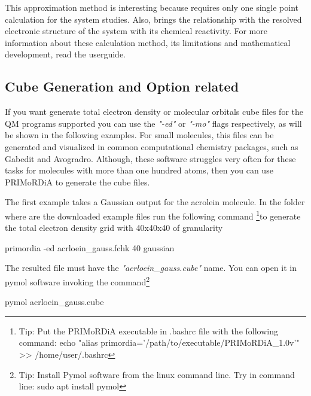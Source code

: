 \documentclass[a4paper,11pt]{refart}
\begin{document}
This approximation method is interesting because requires only one single point calculation for the system studies. Also, brings the relationship with the resolved electronic structure of the system with its chemical reactivity. For more information about these calculation method, its limitations and mathematical development, read the userguide.

\subsection{Cube Generation and Option related}

If you want generate total electron density or molecular orbitals cube files for the QM programs supported you can use the \emph{"-ed"} or \emph{"-mo"} flags respectively, as will be shown in the following examples. For small molecules, this files can be generated and visualized in common computational chemistry packages, such as Gabedit and Avogradro. Although, these software struggles very often for these tasks for molecules with more than one hundred atoms, then you can use PRIMoRDiA to generate the cube files. 

The first example takes a Gaussian output for the acrolein molecule. In the folder where are the downloaded example files run the following command \footnote{Tip: Put the PRIMoRDiA executable in .bashrc file with the following command: echo "alias primordia='/path/to/executable/PRIMoRDiA\_1.0v'" >> /home/user/.bashrc }to generate the total electron density grid with 40x40x40 of granularity 

\hspace*{-\leftmarginwidth}
\begin{minipage}{\fullwidth}
	\begin{commandshell}
		primordia -ed acrloein_gauss.fchk 40 gaussian
	\end{commandshell}
\end{minipage}

The resulted file must have the \emph{"acrloein\_gauss.cube"} name. 
You can open it in pymol software invoking the command\footnote{Tip: Install Pymol software from the linux command line. Try in command line: sudo apt install pymol}

\hspace*{-\leftmarginwidth}
\begin{minipage}{\fullwidth}
	\begin{commandshell}
		pymol acrloein_gauss.cube
	\end{commandshell}
\end{minipage}
\end{document}
